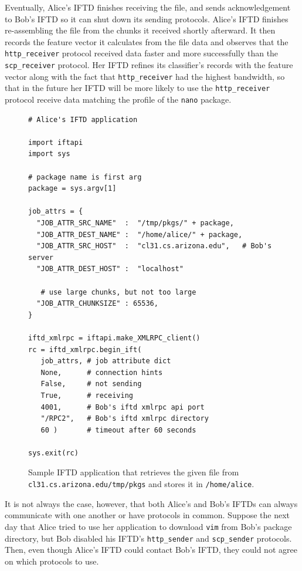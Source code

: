 Eventually, Alice's IFTD finishes receiving the file, and sends acknowledgement to Bob's IFTD so it can shut down its sending protocols.  Alice's IFTD finishes re-assembling the file from the chunks it received shortly afterward.  It then records the feature vector it calculates from the file data and observes that the \texttt{http\_receiver} protocol received data faster and more successfully than the \texttt{scp\_receiver} protocol.  Her IFTD refines its classifier's records with the feature vector along with the fact that \texttt{http\_receiver} had the highest bandwidth, so  that in the future her IFTD will be more likely to use the \texttt{http\_receiver} protocol receive data matching the profile of the \texttt{nano} package.

\begin{figure}[ht!]
\begin{verbatim}
# Alice's IFTD application

import iftapi
import sys

# package name is first arg
package = sys.argv[1]

job_attrs = { 
  "JOB_ATTR_SRC_NAME"  :  "/tmp/pkgs/" + package,
  "JOB_ATTR_DEST_NAME" :  "/home/alice/" + package,
  "JOB_ATTR_SRC_HOST"  :  "cl31.cs.arizona.edu",   # Bob's server
  "JOB_ATTR_DEST_HOST" :  "localhost"
  
   # use large chunks, but not too large
  "JOB_ATTR_CHUNKSIZE" : 65536,
}

iftd_xmlrpc = iftapi.make_XMLRPC_client()
rc = iftd_xmlrpc.begin_ift(
   job_attrs, # job attribute dict
   None,      # connection hints
   False,     # not sending 
   True,      # receiving 
   4001,      # Bob's iftd xmlrpc api port 
   "/RPC2",   # Bob's iftd xmlrpc directory
   60 )       # timeout after 60 seconds 

sys.exit(rc)
\end{verbatim}
\caption{Sample IFTD application that retrieves the given file from \texttt{cl31.cs.arizona.edu/tmp/pkgs} and stores it in \texttt{/home/alice}.}
\end{figure}

It is not always the case, however, that both Alice's and Bob's IFTDs can always communicate with one another or have protocols in common.  Suppose the next day that Alice tried to use her application to download \texttt{vim} from Bob's package directory, but Bob disabled his IFTD's \texttt{http\_sender} and \texttt{scp\_sender} protocols.  Then, even though Alice's IFTD could contact Bob's IFTD, they could not agree on which protocols to use.

